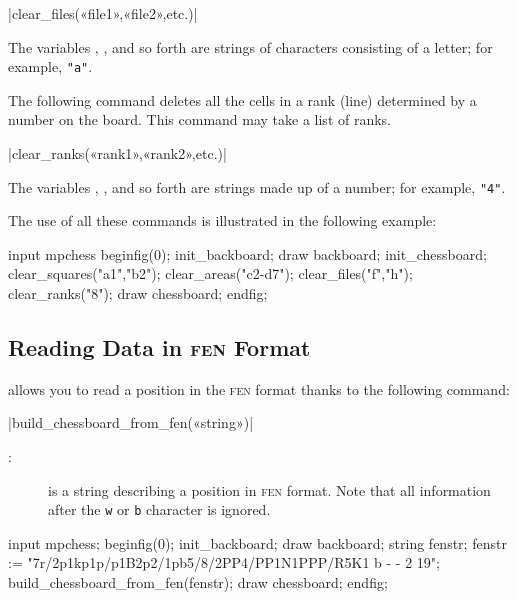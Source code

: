 \documentclass[english]{ltxdoc}
\begin{document}
\commande|clear_files(«file1»,«file2»,etc.)|\smallskip

The variables \textbf{}, \textbf{}, and so
forth are strings of characters consisting of a letter; for example, \lstinline+"a"+.
\medskip

The following command deletes all the cells in a rank (line) determined by a
number on the board. This command may take a list of ranks.

\commande|clear_ranks(«rank1»,«rank2»,etc.)|\smallskip

The variables \textbf{}, \textbf{}, and so
forth are strings made up of a number; for example, \lstinline+"4"+.

The use of all these commands is illustrated in the following example:

\begin{ExempleMP}
input mpchess
beginfig(0);
init_backboard;
draw backboard;
init_chessboard;
clear_squares("a1","b2");
clear_areas("c2-d7");
clear_files("f","h");
clear_ranks("8");
draw chessboard;
endfig;
\end{ExempleMP}



\subsection{Reading Data in \textsc{fen} Format}

\mpchess allows you to read a position in the \textsc{fen} format thanks to the following command:

\commande|build_chessboard_from_fen(«string»)|\smallskip

\begin{description}
\item[:] is a string describing a position in
\textsc{fen} format. Note that all information after the 
\texttt{w} or \texttt{b} character is ignored. 
\end{description}

\begin{ExempleMP}
input mpchess;
beginfig(0);
init_backboard;
draw backboard;
string fenstr;
fenstr := "7r/2p1kp1p/p1B2p2/1pb5/8/2PP4/PP1N1PPP/R5K1 b - - 2 19";
build_chessboard_from_fen(fenstr);
draw chessboard;
endfig;
\end{ExempleMP}
\end{document}
